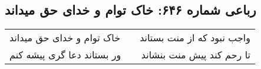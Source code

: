 \begin{center}
\section*{رباعی شماره ۶۴۶: خاک توام و خدای حق میداند}
\label{sec:0646}
\begin{longtable}{l p{0.5cm} r}
خاک توام و خدای حق میداند
&&
واجب نبود که از منت بستاند
\\
ور بستاند دعا گری پیشه کنم
&&
تا رحم کند پیش منت بنشاند
\\
\end{longtable}
\end{center}

